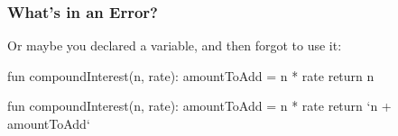 \documentclass[aspectratio=169, handout]{beamer}
\newcommand{\cmark}{{\color{green!80!black}\ding{51}}}
\newcommand{\xmark}{{\color{red}\ding{55}}}
\begin{document}
\begin{frame}[fragile]
  \frametitle{What's in an Error?}

  Or maybe you declared a variable, and then forgot to use it:

  \pause
  \begin{center}
    \begin{minipage}[t][0.9in][t]{\textwidth}
      \begin{minipage}{0.2\textwidth}
        \centering
        \vspace{\fill}
        {\huge\xmark}
        \vspace{\fill}
      \end{minipage}
      \begin{minipage}{0.75\textwidth}
        {\small
          \begin{codeblock}[rulecolor=\color{red}, framerule=0.3mm, language=python]
            fun compoundInterest(n, rate):
              amountToAdd = n * rate
              return n
          \end{codeblock}
          }
        \end{minipage}
    \end{minipage}
    \pause
    \begin{minipage}[t][0.9in][t]{\textwidth}
      \begin{minipage}{0.2\textwidth}
        \centering
        \vspace{\fill}
        {\huge\cmark}
        \vspace{\fill}
      \end{minipage}
      \begin{minipage}{0.75\textwidth}
        {\small
        \begin{codeblock}[rulecolor=\color{green!80!black}, framerule=0.3mm, language=python]
          fun compoundInterest(n, rate):
            amountToAdd = n * rate
            return `n + amountToAdd`
        \end{codeblock}
        }
      \end{minipage}
    \end{minipage}
  \end{center}
\end{frame}
\end{document}
